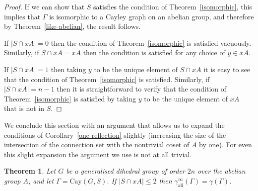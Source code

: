 \documentclass{amsart}
\newtheorem{thm}{Theorem}[section]
\theoremstyle{remark}
\theoremstyle{definition}
\newcommand{\Cay}[2]{\mathrm{Cay}(#1,#2)}		%
\newcommand{\etdom}{\gamma_{\mathrm{all}}^\infty}
\begin{document}
\begin{proof}
    If we can show that $S$ satisfies the condition of Theorem~\ref{isomorphic}, this implies that $\Gamma$ is isomorphic to a Cayley graph on an abelian group, and therefore by Theorem~\ref{like-abelian}, the result follows.

    If $|S \cap xA|=0$ then the condition of Theorem~\ref{isomorphic} is satisfied vacuously. Similarly, if $S \cap xA=xA$ then the condition is satisfied for any choice of $y \in xA$.

    If $|S\cap xA|=1$ then taking $y$ to be the unique element of $S \cap xA$  it is easy to see that the condition of Theorem~\ref{isomorphic} is satisfied. Similarly, if $|S \cap xA|=n-1$ then it is straightforward to verify that the condition of Theorem~\ref{isomorphic} is satisfied by taking $y$ to be the unique element of $xA$ that is not in $S$.
\end{proof}

We conclude this section with an argument that allows us to expand the conditions of Corollary~\ref{one-reflection} slightly (increasing the size of the intersection of the connection set with the nontrivial coset of $A$ by one). For even this slight expansion the argument we use is not at all trivial.

\begin{thm}
    Let $G$ be a generalised dihedral group of order $2n$ over the abelian group $A$, and let $\Gamma=\Cay{G}{S}$. If $|S \cap xA| \le 2$ then $\etdom(\Gamma)=\gamma(\Gamma)$.
\end{thm}
\end{document}
